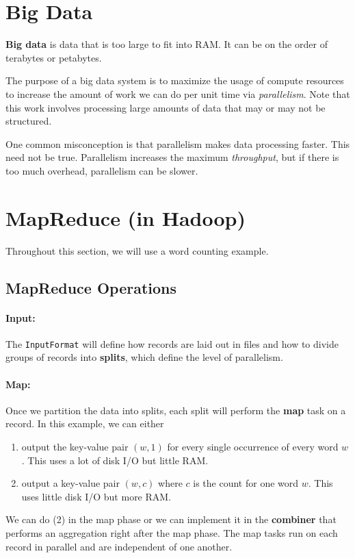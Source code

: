 \documentclass{report}
\newenvironment{definition}[1]{\begin{tcolorbox}[title={Definition: #1}]}{\end{tcolorbox}}
\newenvironment{aside}{\begin{tcolorbox}[title={Aside},colback=blue!5!white,colframe=black!75!blue]}{\end{tcolorbox}}
\renewcommand{\bf}[1]{\textbf{{#1}}}
\renewcommand{\tt}[1]{\texttt{{#1}}}
\renewcommand{\it}[1]{\textit{{#1}}}
\begin{document}
\section{Big Data}
\begin{definition}{Big Data}
    \bf{Big data} is data that is too large to fit into RAM. It can be on the
    order of terabytes or petabytes.
\end{definition}

The purpose of a big data system is to maximize the usage of compute resources
to increase the amount of work we can do per unit time via \it{parallelism}.
Note that this work involves processing large amounts of data that may or may
not be structured.

\begin{aside}
    One common misconception is that parallelism makes data processing faster.
    This need not be true. Parallelism increases the maximum \it{throughput},
    but if there is too much overhead, parallelism can be slower.
\end{aside}

\section{MapReduce (in Hadoop)}
Throughout this section, we will use a word counting example.

\subsection{MapReduce Operations}
\paragraph{Input:}
The \tt{InputFormat} will define how records are laid out in files and how to
divide groups of records into \bf{splits}, which define the level of
parallelism.

\paragraph{Map:}
Once we partition the data into splits, each split will perform the \bf{map}
task on a record. In this example, we can either
\begin{enumerate}[label=(\arabic*)]
    \item output the key-value pair $(w, 1)$ for every single occurrence of
        every word $w$. This uses a lot of disk I/O but little RAM.
    \item output a key-value pair $(w, c)$ where $c$ is the count for one word
        $w$. This uses little disk I/O but more RAM.
\end{enumerate}
We can do (2) in the map phase or we can implement it in the \bf{combiner} that
performs an aggregation right after the map phase. The map tasks run on each
record in parallel and are independent of one another.
\end{document}
